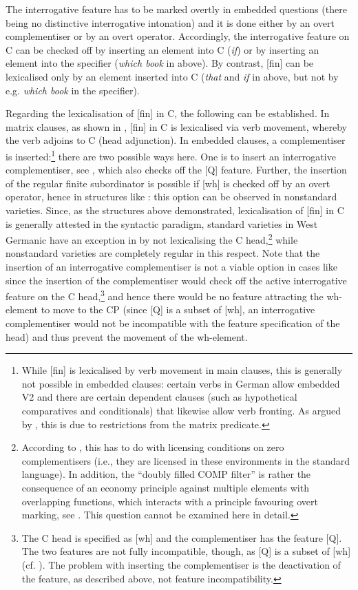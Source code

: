 \documentclass[output=paper,modfonts, hidelinks, newtxmath]{langscibook}
\begin{document}
\noindent The interrogative feature has to be marked overtly in embedded questions (there being no distinctive interrogative intonation) and it is done either by an overt complementiser or by an overt operator. Accordingly, the interrogative feature on C can be checked off by inserting an element into C (\textit{if}) or by inserting an element into the specifier (\textit{which book} in  above). By contrast, [fin] can be lexicalised only by an element inserted into C (\textit{that} and \textit{if} in  above, but not by e.g. \textit{which book} in the specifier).

Regarding the lexicalisation of [fin] in C, the following can be established. In matrix clauses, as shown in , [fin] in C is lexicalised via verb movement, whereby the verb adjoins to C (head adjunction). In embedded clauses, a complementiser is inserted:\footnote{While [fin] is lexicalised by verb movement in main clauses, this is generally not possible in embedded clauses: certain verbs in German allow embedded V2 and there are certain dependent clauses (such as hypothetical comparatives and conditionals) that likewise allow verb fronting. As argued by \citet{bacskaiatkaritoappear}, this is due to restrictions from the matrix predicate.} there are two possible ways here. One is to insert an interrogative complementiser, see , which also checks off the [Q] feature. Further, the insertion of the regular finite subordinator is possible if [wh] is checked off by an overt operator, hence in structures like : this option can be observed in nonstandard varieties. Since, as the structures above demonstrated, lexicalisation of [fin] in C is generally attested in the syntactic paradigm, standard varieties in West Germanic have an exception in  by not lexicalising the C head,\footnote{According to \citet{bacskaiatkaritoappear}, this has to do with licensing conditions on zero complementisers (i.e., they are licensed in these environments in the standard language). In addition, the ``doubly filled COMP filter'' is rather the consequence of an economy principle against multiple elements with overlapping functions, which interacts with a principle favouring overt marking, see \citet{vangelderen2009}. This question cannot be examined here in detail.} while nonstandard varieties are completely regular in this respect. Note that the insertion of an interrogative complementiser is not a viable option in cases like  since the insertion of the complementiser would check off the active interrogative feature on the C head,\footnote{The C head is specified as [wh] and the complementiser has the feature [Q]. The two features are not fully incompatible, though, as [Q] is a subset of [wh] (cf. \citealt{bayer2004}). The problem with inserting the complementiser is the deactivation of the feature, as described above, not feature incompatibility.} and hence there would be no feature attracting the wh-element to move to the CP (since [Q] is a subset of [wh], an interrogative complementiser would not be incompatible with the feature specification of the head) and thus prevent the movement of the wh-element.
\end{document}
